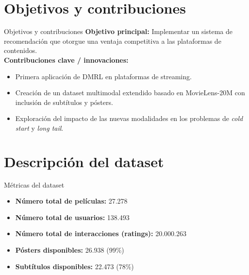 \documentclass{beamer}
\begin{document}
\section{Objetivos y contribuciones}
\begin{frame}{Objetivos y contribuciones}
\pause
    \textbf{Objetivo principal:} Implementar un sistema de recomendación que otorgue una ventaja competitiva a las plataformas de contenidos. \\
    \pause
    \vspace{0.5cm}
    \textbf{Contribuciones clave / innovaciones:}
    \pause
    \begin{itemize}
        \item Primera aplicación de DMRL en plataformas de streaming.
        \pause
        \item Creación de un dataset multimodal extendido basado en MovieLens-20M con inclusión de subtítulos y pósters.
        \pause
        \item Exploración del impacto de las nuevas modalidades en los problemas de \textit{cold start} y \textit{long tail}.
    \end{itemize}
\end{frame}

\section{Descripción del dataset}

\begin{frame}{Métricas del dataset}
\pause
    \begin{itemize}
        \item \textbf{Número total de películas:} 27.278
        \item \textbf{Número total de usuarios:} 138.493
        \item \textbf{Número total de interacciones (ratings):} 20.000.263
        \pause
        \item \textbf{Pósters disponibles:} 26.938 (99\%)
        \pause
        \item \textbf{Subtítulos disponibles:} 22.473 (78\%)
    \end{itemize}
\end{frame}
\end{document}
